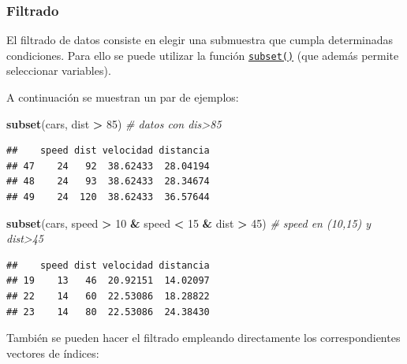 \documentclass[]{book}
\newenvironment{Shaded}{\begin{snugshade}}{\end{snugshade}}
\newcommand{\KeywordTok}[1]{\textcolor[rgb]{0.13,0.29,0.53}{\textbf{#1}}}
\newcommand{\DecValTok}[1]{\textcolor[rgb]{0.00,0.00,0.81}{#1}}
\newcommand{\StringTok}[1]{\textcolor[rgb]{0.31,0.60,0.02}{#1}}
\newcommand{\CommentTok}[1]{\textcolor[rgb]{0.56,0.35,0.01}{\textit{#1}}}
\newcommand{\OperatorTok}[1]{\textcolor[rgb]{0.81,0.36,0.00}{\textbf{#1}}}
\newcommand{\NormalTok}[1]{#1}
\begin{document}
\subsubsection{Filtrado}\label{filtrado}

El filtrado de datos consiste en elegir una submuestra que cumpla
determinadas condiciones. Para ello se puede utilizar la función
\href{https://www.rdocumentation.org/packages/base/versions/3.6.1/topics/subset}{\texttt{subset()}}
(que además permite seleccionar variables).

A continuación se muestran un par de ejemplos:

\begin{Shaded}
\begin{Highlighting}[]
\KeywordTok{subset}\NormalTok{(cars, dist }\OperatorTok{>}\StringTok{ }\DecValTok{85}\NormalTok{) }\CommentTok{# datos con dis>85}
\end{Highlighting}
\end{Shaded}

\begin{verbatim}
##    speed dist velocidad distancia
## 47    24   92  38.62433  28.04194
## 48    24   93  38.62433  28.34674
## 49    24  120  38.62433  36.57644
\end{verbatim}

\begin{Shaded}
\begin{Highlighting}[]
\KeywordTok{subset}\NormalTok{(cars, speed }\OperatorTok{>}\StringTok{ }\DecValTok{10} \OperatorTok{&}\StringTok{ }\NormalTok{speed }\OperatorTok{<}\StringTok{ }\DecValTok{15} \OperatorTok{&}\StringTok{ }\NormalTok{dist }\OperatorTok{>}\StringTok{ }\DecValTok{45}\NormalTok{) }\CommentTok{# speed en (10,15) y dist>45}
\end{Highlighting}
\end{Shaded}

\begin{verbatim}
##    speed dist velocidad distancia
## 19    13   46  20.92151  14.02097
## 22    14   60  22.53086  18.28822
## 23    14   80  22.53086  24.38430
\end{verbatim}

También se pueden hacer el filtrado empleando directamente los
correspondientes vectores de índices:

\begin{Shaded}
\end{Shaded}
\end{document}
